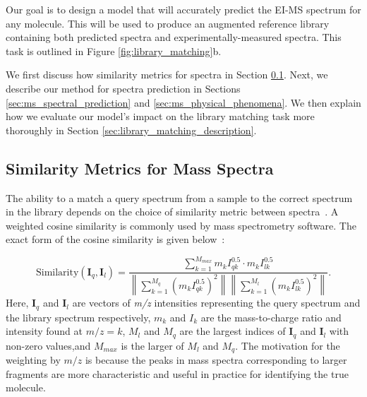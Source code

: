 \documentclass{article}
\begin{document}
Our goal is to design a model that will accurately predict the EI-MS spectrum for any molecule. This will be used to produce an augmented reference library containing both predicted spectra and experimentally-measured spectra.  This task is outlined in Figure \ref{fig:library_matching}b. 

We first discuss how similarity metrics for spectra in Section \ref{sec:similarity_discussion}. Next, we describe our method for spectra prediction in Sections \ref{sec:ms_spectral_prediction} and \ref{sec:ms_physical_phenomena}. We then explain how we evaluate our model's impact on the library matching task more thoroughly in Section \ref{sec:library_matching_description}.


\subsection{Similarity Metrics for Mass Spectra}\label{sec:similarity_discussion}

The ability to a match a query spectrum from a sample to the correct spectrum in the library depends on the choice of similarity metric between spectra~\cite{mclafferty1974probability,stein1994optimization}.
A weighted cosine similarity is commonly used by mass spectrometry software. The exact form of the cosine similarity is given below~\cite{stein1994optimization}:

\begin{equation}\label{eq:stein-similarity}
\text{Similarity}(\boldsymbol{I}_q, \boldsymbol{I}_l) = \frac{\sum_{k=1}^{M_{max}} m_{k} I_{qk}^{0.5} \cdot m_{k} I_{lk}^{0.5}}{\left\lVert\sum_{k=1}^{M_q} (m_{k} I_{qk}^{0.5})^2\right\rVert \left\lVert\sum_{k=1}^{M_l} (m_{k} I_{lk}^{0.5})^2\right\rVert}.
\end{equation}
Here, {$\boldsymbol{I}_q$} and {$\boldsymbol{I}_l$} are vectors of \textit{m/z} intensities representing the query spectrum and the library spectrum respectively, $m_k$ and $I_k$ are the mass-to-charge ratio and intensity found at $m/z = k$, $M_l$ and $M_q$ are the largest indices of $\boldsymbol{I}_q$ and $\boldsymbol{I}_l$ with non-zero values,and $M_{max}$ is the larger of $M_l$ and $M_q$. The motivation for the weighting by $m/z$ is because the peaks in mass spectra corresponding to larger fragments are more characteristic and useful in practice for identifying the true molecule.
\end{document}
